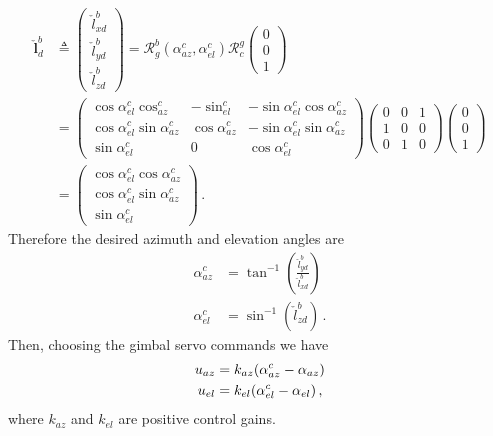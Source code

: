 \begin{align}
\check{\boldsymbol{l}}_d^b&\triangleq
\begin{pmatrix}
\check{l}_{xd}^b \\
\check{l}_{yd}^b \\
\check{l}_{zd}^b
\end{pmatrix}
= \mathcal{R}_g^b(\alpha_{az}^c,\alpha_{el}^c)\mathcal{R}_c^g
\begin{pmatrix}
0 \\
0 \\
1 
\end{pmatrix} \\
&=
\begin{pmatrix}
\cos\alpha_{el}^c\cos_{az}^c & -\sin_{el}^c & -\sin\alpha_{el}^c\cos\alpha_{az}^c \\
\cos\alpha_{el}^c\sin\alpha_{az}^c & \cos\alpha_{az}^c & -\sin\alpha_{el}^c\sin\alpha_{az}^c \\
\sin\alpha_{el}^c & 0 & \cos\alpha_{el}^c
\end{pmatrix}
\begin{pmatrix}
0 & 0 & 1 \\
1 & 0 & 0 \\
0 & 1 & 0 
\end{pmatrix}
\begin{pmatrix}
0 \\
0 \\
1
\end{pmatrix} \\
&= 
\begin{pmatrix}
\cos\alpha_{el}^c\cos\alpha_{az}^c \\
\cos\alpha_{el}^c\sin\alpha_{az}^c \\
\sin\alpha_{el}^c
\end{pmatrix}\,.
\end{align}
Therefore the desired azimuth and elevation angles are
\begin{align}
\alpha_{az}^c&=\tan^{-1}\left(\frac{\check{l}_{yd}^b}{\check{l}_{xd}^b}\right) \\
\alpha_{el}^c&=\sin^{-1}\left(\check{l}_{zd}^b\right)\,.
\end{align}
Then, choosing the gimbal servo commands we have 
\begin{align}{\label{eq:servo_commands}}
u_{az}&=k_{az}(\alpha_{az}^c-\alpha_{az}) \\
u_{el}&=k_{el}(\alpha_{el}^c-\alpha_{el})\,,
\end{align}
where $k_{az}$ and $k_{el}$ are positive control gains.

